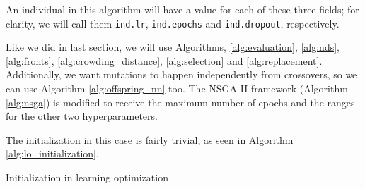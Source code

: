 	An individual in this algorithm will have a value for each of these three fields; for clarity, we will call them \texttt{ind.lr}, \texttt{ind.epochs} and \texttt{ind.dropout}, respectively.

	Like we did in last section, we will use Algorithms, \ref{alg:evaluation}, \ref{alg:nds}, \ref{alg:fronts}, \ref{alg:crowding_distance}, \ref{alg:selection} and \ref{alg:replacement}. Additionally, we want mutations to happen independently from crossovers, so we can use Algorithm \ref{alg:offspring_nn} too. The NSGA-II framework (Algorithm \ref{alg:nsga}) is modified to receive the maximum number of epochs and the ranges for the other two hyperparameters.

	The initialization in this case is fairly trivial, as seen in Algorithm \ref{alg:lo_initialization}.

	\vspace{0.3cm}

	\begin{algorithm}[H]\label{alg:lo_initialization}


		\caption{Initialization in learning optimization}

	\end{algorithm}
